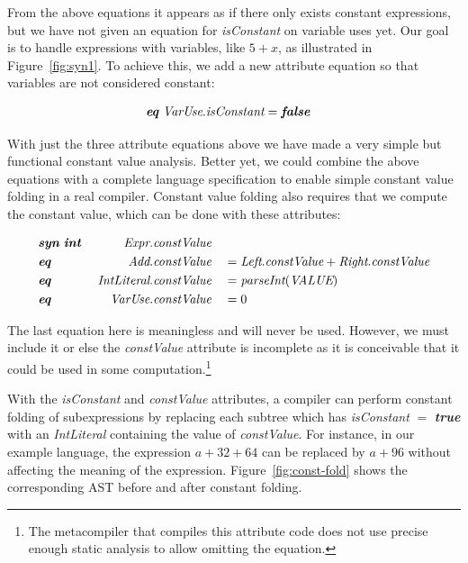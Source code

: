 \documentclass[10pt, twoside, openright]{book}
\newcommand{\figref}[1]{Figure~\ref{#1}}
\begin{document}
From the above equations it appears as if there only exists constant expressions, but
we have not given an equation for \emph{isConstant} on variable uses yet.
Our goal is to handle expressions with variables, like $5+x$, as illustrated in \figref{fig:syn1}.
To achieve this, we add a new attribute equation so that variables are not considered constant:

\begin{align*}
\textbf{\textit{eq}} \; \textit{VarUse}.&\textit{isConstant} = \textbf{\textit{false}}
\end{align*}


With just the three attribute equations above we have made a very simple but functional constant
value analysis.  Better yet, we could combine the above equations with a complete language
specification to enable simple constant value folding in a real compiler. Constant value folding also requires
that we compute the constant value, which can be done with these attributes:


\begin{alignat*}{3}
& \textbf{\textit{syn}} \; \textbf{\textit{int}} & \; \textit{Expr}.&\textit{constValue} && \\
& \textbf{\textit{eq}} & \; \textit{Add}.&\textit{constValue} &&= \textit{Left}.\textit{constValue} + \textit{Right}.\textit{constValue} \\
& \textbf{\textit{eq}} & \; \textit{IntLiteral}.&\textit{constValue} &&= \textit{parseInt}(\textit{VALUE}) \\
& \textbf{\textit{eq}} & \; \textit{VarUse}.&\textit{constValue} &&= 0
\end{alignat*}

\noindent
The last equation here is meaningless and will never be used. However, we must
include it or else the \emph{constValue} attribute is incomplete as it is
conceivable that it could be used in some computation.\footnote{The metacompiler
that compiles this attribute code does not use precise enough static
analysis to allow omitting the equation.}

With the \emph{isConstant} and \emph{constValue} attributes, a compiler can perform
constant folding of subexpressions by replacing each subtree which has \emph{isConstant} $=$ \textbf{\textit{true}}
with an \emph{IntLiteral} containing the value of \emph{constValue}.
For instance, in our example language, the
expression $a+32+64$ can be replaced by $a+96$ without affecting the meaning of the
expression. \figref{fig:const-fold} shows
the corresponding AST before and after constant folding.
\end{document}
